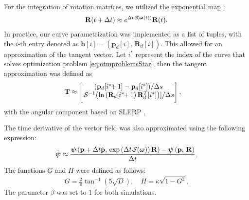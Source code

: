 For the integration of rotation matrices, we utilized the exponential map \citep{Culbertson2021}:
\begin{equation}
    \mathbf{R}(t+\Delta t) \approx e^{\Delta t\SL[\boldsymbol{\omega}(t)]}\mathbf{R}(t). \label{eq:exponentialmap-integration-rotation}
\end{equation}
In practice, our curve parametrization was implemented as a list of tuples, with the $i$-th entry denoted as $\mathbf{h}[i]=(\mathbf{p}_d[i],\, \mathbf{R}_d[i])$. This allowed for an approximation of the tangent vector. Let $i^*$ represent the index of the curve that solves optimization problem \eqref{eq:otmproblemsStar}, then the tangent approximation was defined as
\begin{align}
    \mathbf{T} &\approx \begin{bmatrix}
        (\mathbf{p}_d[i^*\!\!+1] - \mathbf{p}_d[i^*])\slash\Delta s\\\vspace{1mm}
        \invSL[\ln\left(\mathbf{R}_d[i^*\!\!+1]\mathbf{R}_d^T[i^*]\right)]\slash\Delta s
    \end{bmatrix}, \label{eq:tangent-approximation}
\end{align}
with the angular component based on SLERP \citep[p. 104]{hanson2006visualizing}.

The time derivative of the vector field was also approximated using the following expression:
\begin{align}
    \dot{\boldsymbol{\psi}} \approx 
        \frac{\boldsymbol{\psi}\left(\mathbf{p}+\Delta t\dot{\mathbf{p}},\, \exp\left(\Delta t\SL[\boldsymbol{\omega}]\right)\mathbf{R}\right) - \boldsymbol{\psi}\left(\mathbf{p},\, \mathbf{R}\right)}{\Delta t}.
\end{align}
The functions $G$ and $H$ were defined as follows:
\begin{align}
    G = \frac{2}{\pi}\tan^{-1}\left(5\sqrt{D}\right),\quad
    H = \kappa\sqrt{1 - G^2}.
\end{align}
The parameter $\beta$ was set to $1$ for both simulations.


